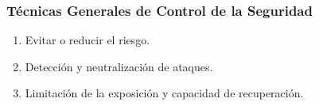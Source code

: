 \documentclass[a4paper,slidestop,xcolor=pst,dvips,blue]{beamer}
\begin{document}
\begin{frame}[c]
    \frametitle{Técnicas Generales de Control de la Seguridad}
    \begin{enumerate}[<+->]
        \item Evitar o reducir el riesgo.
        \item Detección y neutralización de ataques.
        \item Limitación de la exposición y capacidad de recuperación.
    \end{enumerate}
\end{frame}

%
\end{document}
